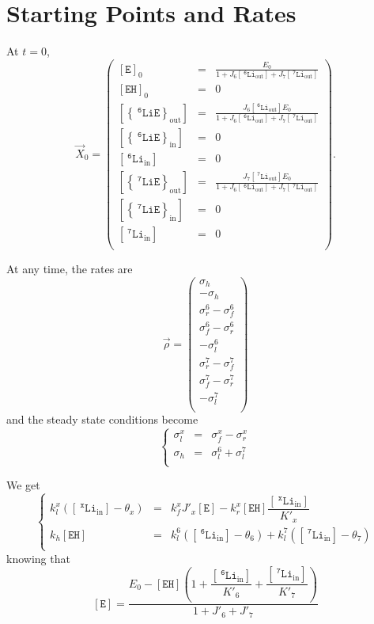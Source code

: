 \documentclass[aps,onecolumn,11pt]{revtex4}
\newcommand{\mychem}[1]{\mathtt{#1}}
\newcommand{\myconc}[1]{\left\lbrack{#1}\right\rbrack}
\newcommand{\spLi}[1]{{~^{\mychem{#1}}\mychem{Li}}}
\newcommand{\spEout}{\mychem{E}}
\newcommand{\Eout}{\myconc{\spEout}}
\newcommand{\spLiEin}[1]{\left\lbrace\spLi{#1}\spEout\right\rbrace_{\mathrm{in}}}
\newcommand{\LiEin}[1]{\myconc{\spLiEin{#1}}}
\newcommand{\spLiEout}[1]{\left\lbrace\spLi{#1}\spEout\right\rbrace_{\mathrm{out}}}
\newcommand{\LiEout}[1]{\myconc{\spLiEout{#1}}}
\newcommand{\spLiIn}[1]{{\spLi{#1}}_{\mathrm{in}}}
\newcommand{\LiIn}[1]{\myconc{\spLiIn{#1}}}
\newcommand{\spLiOut}[1]{{\spLi{#1}}_{\mathrm{out}}}
\newcommand{\LiOut}[1]{\myconc{\spLiOut{#1}}}
\newcommand{\spEHin}{\mychem{EH}}
\newcommand{\EHin}{\myconc{\spEHin}}
\begin{document}
\section{Starting Points and Rates}

At $t=0$,
\begin{equation}
	\vec{X}_0 = 
	\begin{pmatrix}
	\Eout_0    & = & \frac{E_0}{1+J_6 \LiOut{6} + J_7 \LiOut{7}}  \\
	\EHin_0    & = & 0 \\
	\LiEout{6} & = & \frac{J_6 \LiOut{6} E_0} {1+J_6 \LiOut{6} + J_7 \LiOut{7}} \\
	\LiEin{6}  & = & 0 \\
	\LiIn{6}   & = & 0 \\
	\LiEout{7} & = & \frac{J_7 \LiOut{7} E_0} {1+J_6 \LiOut{6} + J_7 \LiOut{7}}   \\
	\LiEin{7}  & = & 0 \\
	\LiIn{7}   & = & 0 \\
	\end{pmatrix}.
\end{equation}

At any time, the rates are
\begin{equation}
\vec{\rho} = 
\begin{pmatrix}
	\sigma_h\\
	-\sigma_h\\
	\sigma_r^6-\sigma_f^6\\
	\sigma_f^6-\sigma_r^6\\
	-\sigma_l^6\\
	\sigma_r^7-\sigma_f^7\\
	\sigma_f^7-\sigma_r^7\\
	-\sigma_l^7\\
\end{pmatrix}
\end{equation}
and the steady state conditions become
\begin{equation}
	\left\lbrace
	\begin{array}{rcl}
		\sigma_l^x & = & \sigma_f^x - \sigma_r^x\\
		\sigma_h   & = & \sigma_l^6 + \sigma_l^7\\
	\end{array}
	\right.
\end{equation}

We get
\begin{equation}
\label{eq:ss}
\left\lbrace
	\begin{array}{rcl}
	k_l^x \left(\LiIn{x}-\theta_x\right) & = & k_f^x J'_x \Eout - k_r^x \EHin \dfrac{\LiIn{x}}{K'_x}\\
	k_h \EHin & = & k_l^6 \left(\LiIn{6}-\theta_6\right) + k_l^7 \left(\LiIn{7}-\theta_7\right)\\
	\end{array}
\right.
\end{equation}
knowing that
\begin{equation}
	\Eout = \dfrac{E_0 - \EHin \left( 1 + \dfrac{\LiIn{6}}{K'_6} + \dfrac{\LiIn{7}}{K'_7}\right)}
	{1+J'_6+J'_7}
\end{equation}
\end{document}
